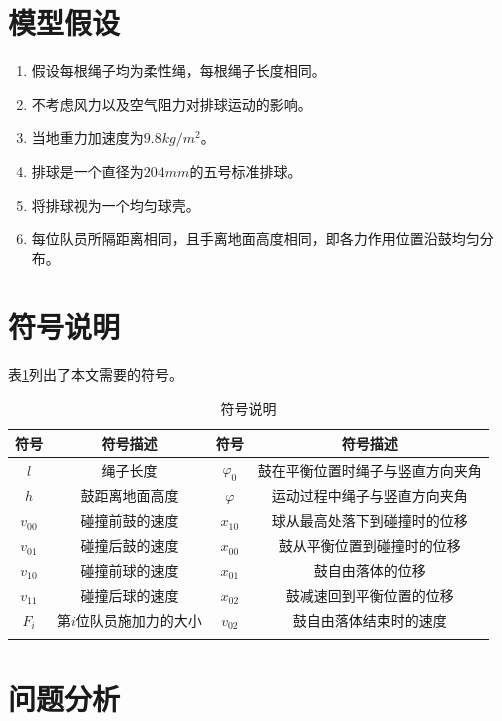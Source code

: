 \documentclass{cumcm}
\begin{document}
\section{模型假设}
\begin{enumerate}
\item 假设每根绳子均为柔性绳，每根绳子长度相同。
\item 不考虑风力以及空气阻力对排球运动的影响。
\item 当地重力加速度为$9.8kg/m^2$。
\item 排球是一个直径为$204mm$的五号标准排球。
\item 将排球视为一个均匀球壳。
\item 每位队员所隔距离相同，且手离地面高度相同，即各力作用位置沿鼓均匀分布。
\end{enumerate}

\section{符号说明}
表\ref{table-symbol}列出了本文需要的符号。
\begin{table}[H]
  \centering
  \caption{符号说明}\label{table-symbol}
  \begin{tabular*}{\textwidth}{c|c|c|c}
  \hline
  符号 & 符号描述 & 符号 & 符号描述\\
  \hline
  $l$ & 绳子长度 &  $\varphi_0$ & 鼓在平衡位置时绳子与竖直方向夹角\\
  $h$ & 鼓距离地面高度 & $\varphi$ & 运动过程中绳子与竖直方向夹角\\
  $v_{00}$ & 碰撞前鼓的速度 &  $x_{10}$ & 球从最高处落下到碰撞时的位移\\
  $v_{01}$ & 碰撞后鼓的速度 &  $x_{00}$ & 鼓从平衡位置到碰撞时的位移\\
  $v_{10}$ & 碰撞前球的速度 & $x_{01}$ & 鼓自由落体的位移\\
  $v_{11}$ & 碰撞后球的速度 & $x_{02}$ & 鼓减速回到平衡位置的位移\\
  $F_i$ & 第$i$位队员施加力的大小 & $v_{02}$ & 鼓自由落体结束时的速度\\
     \\
  \hline
  \end{tabular*}
\end{table}


\section{问题分析}
\end{document}
